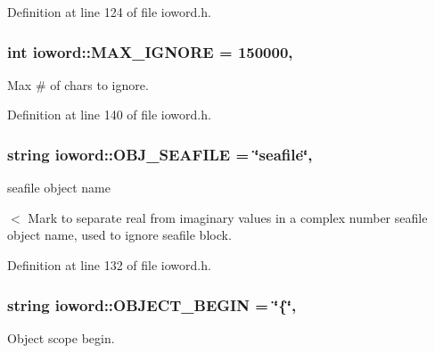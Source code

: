 Definition at line 124 of file ioword.\-h.

\hypertarget{classosea_1_1ofreq_1_1ioword_a3f9e4aa76ff26168e9b07f37776765eb}{
\subsubsection[{M\-A\-X\-\_\-\-I\-G\-N\-O\-R\-E}]{\setlength{\rightskip}{0pt plus 5cm}int ioword\-::\-M\-A\-X\-\_\-\-I\-G\-N\-O\-R\-E = 150000\hspace{0.3cm}{\ttfamily [static]}, {\ttfamily [protected]}}}\label{classosea_1_1ofreq_1_1ioword_a3f9e4aa76ff26168e9b07f37776765eb}
Max \# of chars to ignore. 

Definition at line 140 of file ioword.\-h.

\hypertarget{classosea_1_1ofreq_1_1ioword_a979ed65ebd588bc45d75043183cb8301}{
\subsubsection[{O\-B\-J\-\_\-\-S\-E\-A\-F\-I\-L\-E}]{\setlength{\rightskip}{0pt plus 5cm}string ioword\-::\-O\-B\-J\-\_\-\-S\-E\-A\-F\-I\-L\-E = \char`\"{}seafile\char`\"{}\hspace{0.3cm}{\ttfamily [static]}, {\ttfamily [protected]}}}\label{classosea_1_1ofreq_1_1ioword_a979ed65ebd588bc45d75043183cb8301}
seafile object name

$<$ Mark to separate real from imaginary values in a complex number seafile object name, used to ignore seafile block. 

Definition at line 132 of file ioword.\-h.

\hypertarget{classosea_1_1ofreq_1_1ioword_af8652cc0e8e1c9aeb67450a23870b64c}{
\subsubsection[{O\-B\-J\-E\-C\-T\-\_\-\-B\-E\-G\-I\-N}]{\setlength{\rightskip}{0pt plus 5cm}string ioword\-::\-O\-B\-J\-E\-C\-T\-\_\-\-B\-E\-G\-I\-N = \char`\"{}\{\char`\"{}\hspace{0.3cm}{\ttfamily [static]}, {\ttfamily [protected]}}}\label{classosea_1_1ofreq_1_1ioword_af8652cc0e8e1c9aeb67450a23870b64c}
Object scope begin. 

